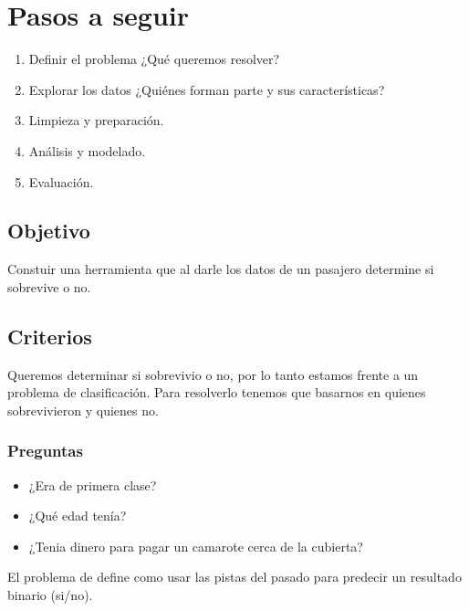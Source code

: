 \chapter{Pasos a seguir}

\begin{enumerate}
    \item Definir el problema ¿Qué queremos resolver?
    \item Explorar los datos ¿Quiénes forman parte y sus características?
    \item Limpieza y preparación.
    \item Análisis y modelado.
    \item Evaluación.
\end{enumerate}

\section{Objetivo}

Constuir una herramienta que al darle los datos de un pasajero determine si sobrevive o no.

\section{Criterios}

Queremos determinar si sobrevivio o no, por lo tanto estamos frente a un problema de clasificación. Para resolverlo tenemos que basarnos en quienes sobrevivieron y quienes no.

\subsection{Preguntas}

\begin{itemize}
    \item ¿Era de primera clase?
    \item ¿Qué edad tenía?
    \item ¿Tenia dinero para pagar un camarote cerca de la cubierta?
\end{itemize}

\begin{nota}
    El problema de define como usar las pistas del pasado para predecir un resultado binario (si/no).
\end{nota}

